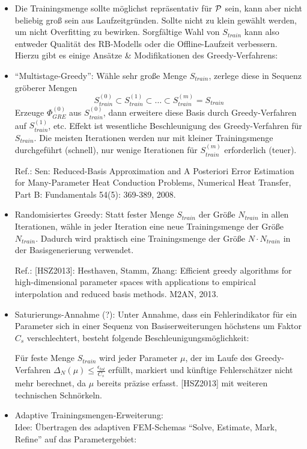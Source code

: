 \begin{bem} \beginwithlistbem
	\begin{itemize}
		\item Die Trainingsmenge sollte möglichst repräsentativ für $\mathcal{P}$ sein, kann aber nicht beliebig groß sein aus Laufzeitgründen.
			Sollte nicht zu klein gewählt werden, um nicht Overfitting zu bewirken.
			Sorgfältige Wahl von $S_{train}$ kann also entweder Qualität des RB-Modells oder die Offline-Laufzeit verbessern.
			Hierzu gibt es einige Ansätze \& Modifikationen des Greedy-Verfahrens:
		\item ``Multistage-Greedy'': Wähle sehr große Menge $S_{train}$, zerlege diese in Sequenz gröberer Mengen
			\[
				S_{train}^{(0)} \subset S_{train}^{(1)} \subset \ldots \subset S_{train}^{(m)} = S_{train}
			\]
			Erzeuge $\Phi_{GRE}^{(0)}$ aus $S_{train}^{(0)}$, dann erweitere diese Basis durch Greedy-Verfahren auf $S_{train}^{(1)}$, etc.
			Effekt ist wesentliche Beschleunigung des Greedy-Verfahren für $S_{train}$.
			Die meisten Iterationen werden nur mit kleiner Trainingsmenge durchgeführt (schnell), nur wenige Iterationen für $S_{train}^{(m)}$ erforderlich (teuer).

			Ref.: Sen: Reduced-Basis Approximation and A Posteriori Error Estimation for Many-Parameter Heat Conduction Problems, Numerical Heat Transfer, Part B: Fundamentals 54(5): 369-389, 2008.
		\item Randomisiertes Greedy: Statt fester Menge $S_{train}$ der Größe $N_{train}$ in allen Iterationen, wähle in jeder Iteration eine neue Trainingsmenge der Größe $N_{train}$.
			Dadurch wird praktisch eine Trainingsmenge der Größe $N \cdot N_{train}$ in der Basisgenerierung verwendet.

			Ref.: [HSZ2013]: Hesthaven, Stamm, Zhang: Efficient greedy algorithms for high-dimensional parameter spaces with applications to empirical interpolation and reduced basis methods. M2AN, 2013.
		\item Saturierungs-Annahme (?): Unter Annahme, dass ein Fehlerindikator für ein Parameter sich in einer Sequenz von Basiserweiterungen höchstens um Faktor $C_s$ verschlechtert, besteht folgende Beschleunigungsmöglichkeit:

			Für feste Menge $S_{train}$ wird jeder Parameter $\mu$, der im Laufe des Greedy-Verfahren $\Delta_N(\mu) \leq \frac{\epsilon_{tol}}{C_s}$ erfüllt, markiert und künftige Fehlerschätzer nicht mehr berechnet, da $\mu$ bereits präzise erfasst. [HSZ2013] mit weiteren technischen Schnörkeln.
		\item Adaptive Trainingsmengen-Erweiterung:\\
			Idee: Übertragen des adaptiven FEM-Schemas ``Solve, Estimate, Mark, Refine'' auf das Parametergebiet:


\end{itemize}
\end{bem}
